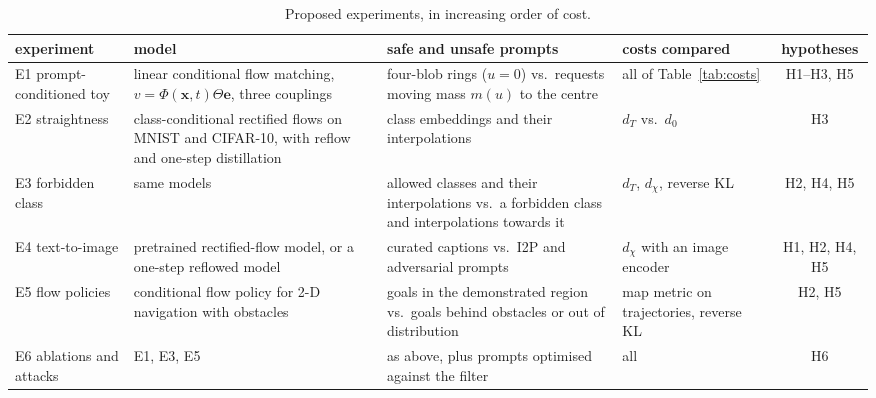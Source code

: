 \documentclass{article}
\newcommand{\bx}{\mathbf{x}}
\newcommand{\be}{\mathbf{e}}                       %
\theoremstyle{plain}
\begin{document}
\begin{table}[!tbp]
\centering
\caption{Proposed experiments, in increasing order of cost.}
\label{tab:plan}
\footnotesize
\begin{tabularx}{\textwidth}{>{\raggedright\arraybackslash}p{1.9cm} >{\raggedright\arraybackslash}X >{\raggedright\arraybackslash}X >{\raggedright\arraybackslash}p{2.4cm} c}
\toprule
experiment & model & safe and unsafe prompts & costs compared & hypotheses\\
\midrule
E1 prompt-con\-ditioned toy & linear conditional flow matching, $v=\Phi(\bx,t)\Theta\be$, three couplings & four-blob rings ($u=0$) vs.\ requests moving mass $m(u)$ to the centre & all of Table~\ref{tab:costs} & H1--H3, H5\\
E2 straightness & class-conditional rectified flows on MNIST and CIFAR-10, with reflow and one-step distillation & class embeddings and their interpolations & $d_T$ vs.\ $d_0$ & H3\\
E3 forbidden class & same models & allowed classes and their interpolations vs.\ a forbidden class and interpolations towards it & $d_T$, $d_\chi$, reverse KL & H2, H4, H5\\
E4 text-to-image & pretrained rectified-flow model, or a one-step reflowed model & curated captions vs.\ I2P and adversarial prompts & $d_\chi$ with an image encoder & H1, H2, H4, H5\\
E5 flow policies & conditional flow policy for 2-D navigation with obstacles & goals in the demonstrated region vs.\ goals behind obstacles or out of distribution & map metric on trajectories, reverse KL & H2, H5\\
E6 ablations and attacks & E1, E3, E5 & as above, plus prompts optimised against the filter & all & H6\\
\bottomrule
\end{tabularx}
\end{table}
\end{document}
